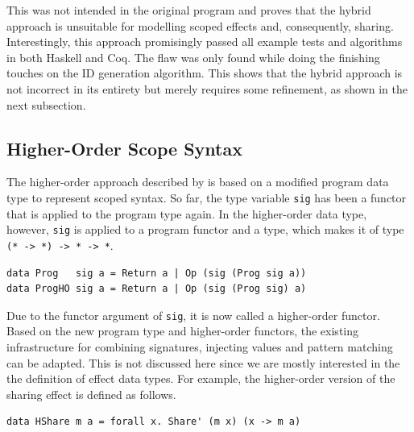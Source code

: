 \documentclass[a4paper, 11pt, fleqn, twoside]{scrreprt}
\newcommand{\hinl}[1]{\texttt{#1}}
\begin{document}
This was not intended in the original program and proves that the hybrid approach is unsuitable for modelling scoped effects and, consequently, sharing.
Interestingly, this approach promisingly passed all example tests and algorithms in both Haskell and Coq.
The flaw was only found while doing the finishing touches on the ID generation algorithm.
This shows that the hybrid approach is not incorrect in its entirety but merely requires some refinement, as shown in the next subsection.

\subsection{Higher-Order Scope Syntax}
\label{subsec:HOscopesyntax}
The higher-order approach described by \citet{wu2014effect} is based on a modified  program data type to represent scoped syntax.
So far, the type variable \hinl{sig} has been a functor that is applied to the program type again.
In the higher-order data type, however, \hinl{sig} is applied to a program functor and a type, which makes it of type \hinl{(* -> *) -> * -> *}.

\begin{verbatim}
data Prog   sig a = Return a | Op (sig (Prog sig a))
data ProgHO sig a = Return a | Op (sig (Prog sig) a)
\end{verbatim}

Due to the functor argument of \hinl{sig}, it is now called a higher-order functor.
Based on the new program type and higher-order functors, the existing infrastructure for combining signatures, injecting values and pattern matching can be adapted.
This is not discussed here since we are mostly interested in the the definition of effect data types.
For example, the higher-order version of the sharing effect is defined as follows.

\begin{verbatim}
data HShare m a = forall x. Share' (m x) (x -> m a)
\end{verbatim}
\end{document}
